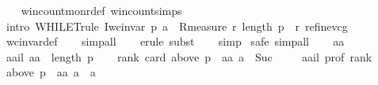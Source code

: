 \begin{isabellebody}
%
\isadelimproof
\ \ %
\endisadelimproof
%
\isatagproof
{}\isamarkupfalse%
\ win{\isacharunderscore}{\kern0pt}count{\isacharunderscore}{\kern0pt}mon{\isacharunderscore}{\kern0pt}r{\isacharunderscore}{\kern0pt}def\ win{\isacharunderscore}{\kern0pt}count{\isachardot}{\kern0pt}simps\isanewline
\ \ \isamarkupfalse%
\ {\isacharparenleft}{\kern0pt}intro\ WHILET{\isacharunderscore}{\kern0pt}rule{\isacharbrackleft}{\kern0pt}\ I{\isacharequal}{\kern0pt}{\isachardoublequoteopen}{\isacharparenleft}{\kern0pt}wc{\isacharunderscore}{\kern0pt}invar\ p\ a{\isacharparenright}{\kern0pt}{\isachardoublequoteclose}\ \ R{\isacharequal}{\kern0pt}{\isachardoublequoteopen}measure\ {\isacharparenleft}{\kern0pt}{\isasymlambda}{\isacharparenleft}{\kern0pt}r{\isacharcomma}{\kern0pt}{\isacharunderscore}{\kern0pt}{\isacharparenright}{\kern0pt}{\isachardot}{\kern0pt}\ {\isacharparenleft}{\kern0pt}length\ p{\isacharparenright}{\kern0pt}\ {\isacharminus}{\kern0pt}\ r{\isacharparenright}{\kern0pt}{\isachardoublequoteclose}{\isacharbrackright}{\kern0pt}\ refine{\isacharunderscore}{\kern0pt}vcg{\isacharparenright}{\kern0pt}\isanewline
\ \ \isamarkupfalse%
\ wc{\isacharunderscore}{\kern0pt}invar{\isacharunderscore}{\kern0pt}def\isanewline
\ \ \isamarkupfalse%
\ {\isacharparenleft}{\kern0pt}simp{\isacharunderscore}{\kern0pt}all{\isacharparenright}{\kern0pt}\isanewline
\ \ \isamarkupfalse%
\ {\isacharparenleft}{\kern0pt}erule\ subst{\isacharparenright}{\kern0pt}\isanewline
\ \ \isamarkupfalse%
\ {\isacharparenleft}{\kern0pt}simp{\isacharparenright}{\kern0pt}\isanewline
{}\isamarkupfalse%
\ {\isacharparenleft}{\kern0pt}safe{\isacharcomma}{\kern0pt}\ simp{\isacharunderscore}{\kern0pt}all{\isacharparenright}{\kern0pt}\isanewline
\ \ \isamarkupfalse%
\ aa\isanewline
\ \ \isamarkupfalse%
\ aail{\isacharcolon}{\kern0pt}\ {\isachardoublequoteopen}aa\ {\isacharless}{\kern0pt}\ length\ p{\isachardoublequoteclose}\isanewline
\ \ \isamarkupfalse%
\ rank{}{\isacharcolon}{\kern0pt}\ {\isachardoublequoteopen}card\ {\isacharparenleft}{\kern0pt}above\ {\isacharparenleft}{\kern0pt}p\ {\isacharbang}{\kern0pt}\ aa{\isacharparenright}{\kern0pt}\ a{\isacharparenright}{\kern0pt}\ {\isacharequal}{\kern0pt}\ Suc\ {}{\isachardoublequoteclose}\isanewline
\ \ \isamarkupfalse%
\ aail\ prof\ rank{}\ \isamarkupfalse%
\ {\isachardoublequoteopen}above\ {\isacharparenleft}{\kern0pt}p\ {\isacharbang}{\kern0pt}\ aa{\isacharparenright}{\kern0pt}\ a\ {\isacharequal}{\kern0pt}\ {\isacharbraceleft}{\kern0pt}a{\isacharbraceright}{\kern0pt}{\isachardoublequoteclose}\isanewline

\end{isabellebody}

